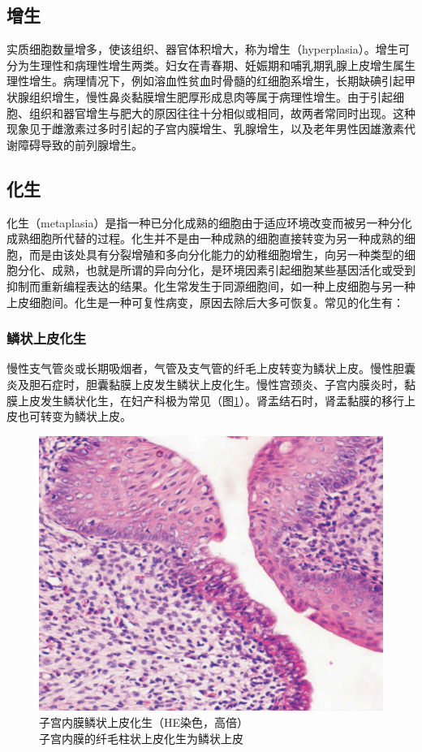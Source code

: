 \subsection{增生}

实质细胞数量增多，使该组织、器官体积增大，称为增生（hyperplasia）。增生可分为生理性和病理性增生两类。妇女在青春期、妊娠期和哺乳期乳腺上皮增生属生理性增生。病理情况下，例如溶血性贫血时骨髓的红细胞系增生，长期缺碘引起甲状腺组织增生，慢性鼻炎黏膜增生肥厚形成息肉等属于病理性增生。由于引起细胞、组织和器官增生与肥大的原因往往十分相似或相同，故两者常同时出现。这种现象见于雌激素过多时引起的子宫内膜增生、乳腺增生，以及老年男性因雄激素代谢障碍导致的前列腺增生。

\subsection{化生}

化生（metaplasia）是指一种已分化成熟的细胞由于适应环境改变而被另一种分化成熟细胞所代替的过程。化生并不是由一种成熟的细胞直接转变为另一种成熟的细胞，而是由该处具有分裂增殖和多向分化能力的幼稚细胞增生，向另一种类型的细胞分化、成熟，也就是所谓的异向分化，是环境因素引起细胞某些基因活化或受到抑制而重新编程表达的结果。化生常发生于同源细胞间，如一种上皮细胞与另一种上皮细胞间。化生是一种可复性病变，原因去除后大多可恢复。常见的化生有：

\subsubsection{鳞状上皮化生}

慢性支气管炎或长期吸烟者，气管及支气管的纤毛上皮转变为鳞状上皮。慢性胆囊炎及胆石症时，胆囊黏膜上皮发生鳞状上皮化生。慢性宫颈炎、子宫内膜炎时，黏膜上皮发生鳞状化生，在妇产科极为常见（图\ref{fig1-2}）。肾盂结石时，肾盂黏膜的移行上皮也可转变为鳞状上皮。
\begin{figure}[!htbp]
	\centering
	\includegraphics{./images/Image00003.jpg}
	\caption{子宫内膜鳞状上皮化生（HE染色，高倍） \\ {\small 子宫内膜的纤毛柱状上皮化生为鳞状上皮}}
	\label{fig1-2}
\end{figure}

